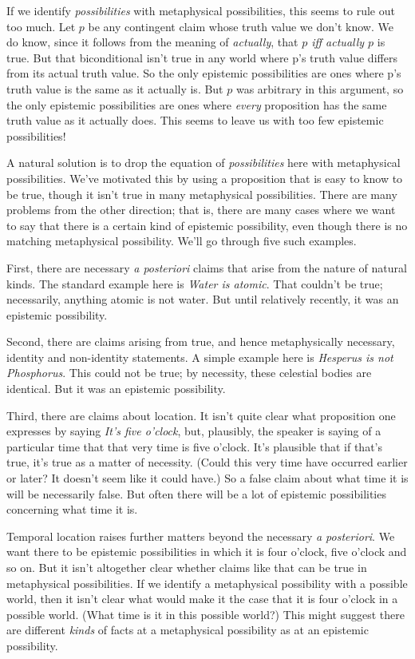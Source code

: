 \noindent If we identify \textit{possibilities} with metaphysical possibilities, this seems to rule out too much. Let $p$ be any contingent claim whose truth value we don't know. We do know, since it follows from the meaning of \textit{actually}, that \textit{$p$ iff actually $p$} is true. But that biconditional isn't true in any world where p's truth value differs from its actual truth value. So the only epistemic possibilities are ones where p's truth value is the same as it actually is. But $p$ was arbitrary in this argument, so the only epistemic possibilities are ones where \textit{every} proposition has the same truth value as it actually does. This seems to leave us with too few epistemic possibilities!

A natural solution is to drop the equation of \textit{possibilities} here with metaphysical possibilities. We've motivated this by using a proposition that is easy to know to be true, though it isn't true in many metaphysical possibilities. There are many problems from the other direction; that is, there are many cases where we want to say that there is a certain kind of epistemic possibility, even though there is no matching metaphysical possibility. We'll go through five such examples.

First, there are necessary \textit{a posteriori} claims that arise from the nature of natural kinds. The standard example here is \textit{Water is atomic}. That couldn't be true; necessarily, anything atomic is not water. But until relatively recently, it was an epistemic possibility.

Second, there are claims arising from true, and hence metaphysically necessary, identity and non-identity statements. A simple example here is \textit{Hesperus is not Phosphorus}. This could not be true; by necessity, these celestial bodies are identical. But it was an epistemic possibility.

Third, there are claims about location. It isn't quite clear what proposition one expresses by saying \textit{It's five o'clock}, but, plausibly, the speaker is saying of a particular time that that very time is five o'clock. It's plausible that if that's true, it's true as a matter of necessity. (Could this very time have occurred earlier or later? It doesn't seem like it could have.) So a false claim about what time it is will be necessarily false. But often there will be a lot of epistemic possibilities concerning what time it is.

Temporal location raises further matters beyond the necessary \textit{a posteriori}. We want there to be epistemic possibilities in which it is four o'clock, five o'clock and so on. But it isn't altogether clear whether claims like that can be true in metaphysical possibilities. If we identify a metaphysical possibility with a possible world, then it isn't clear what would make it the case that it is four o'clock in a possible world. (What time is it in this possible world?) This might suggest there are different \textit{kinds} of facts at a metaphysical possibility as at an epistemic possibility.

